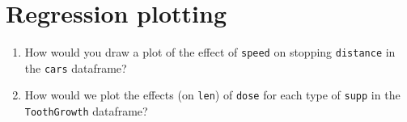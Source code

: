\documentclass[12pt,a4paper]{article}
\begin{document}
\section*{Regression plotting}
\begin{enumerate}
\item How would you draw a plot of the effect of \texttt{speed} on stopping \texttt{distance} in the \texttt{cars} dataframe?
\item How would we plot the effects (on \texttt{len}) of \texttt{dose} for each type of \texttt{supp} in the \texttt{ToothGrowth} dataframe?
\end{enumerate}
\end{document}
